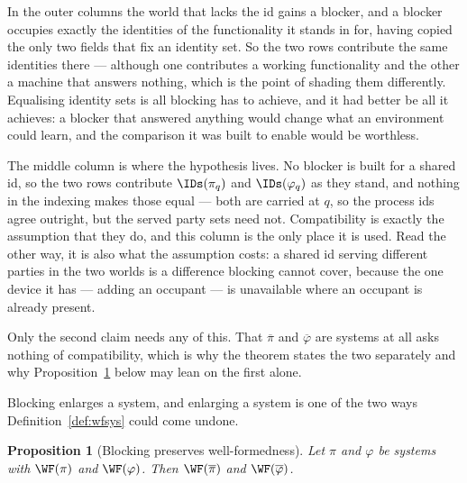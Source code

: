 \documentclass[10pt,oneside,openany]{book}
\theoremstyle{accentdef}
\theoremstyle{accentplain}
\newtheorem{proposition}[definition]{Proposition}
\begin{document}
In the outer columns the world that lacks the id gains a blocker, and a blocker occupies exactly
the identities of the functionality it stands in for, having copied the only two fields that fix
an identity set. So the two rows contribute the same identities there --- although one contributes
a working functionality and the other a machine that answers nothing, which is the point of
shading them differently. Equalising identity sets is all blocking has to achieve, and it had
better be all it achieves: a blocker that answered anything would change what an environment could
learn, and the comparison it was built to enable would be worthless.

The middle column is where the hypothesis lives. No blocker is built for a shared id, so the two
rows contribute $\IDs(\pi_q)$ and $\IDs(\varphi_q)$ as they stand, and nothing in the indexing
makes those equal --- both are carried at $q$, so the process ids agree outright, but the served
party sets need not. Compatibility is exactly the assumption that they do, and this column is the
only place it is used. Read the other way, it is also what the assumption costs: a shared id
serving different parties in the two worlds is a difference blocking cannot cover, because the one
device it has --- adding an occupant --- is unavailable where an occupant is already present.

Only the second claim needs any of this. That $\overline{\pi}$ and $\overline{\varphi}$ are
systems at all asks nothing of compatibility, which is why the theorem states the two separately
and why Proposition~\ref{prop:wfblk} below may lean on the first alone.

Blocking enlarges a system, and enlarging a system is one of the two ways
Definition~\ref{def:wfsys} could come undone.

\begin{proposition}[Blocking preserves well-formedness]\label{prop:wfblk}
Let $\pi$ and $\varphi$ be systems with $\WF(\pi)$ and $\WF(\varphi)$. Then $\WF(\overline{\pi})$
and $\WF(\overline{\varphi})$.
\end{proposition}
\end{document}

